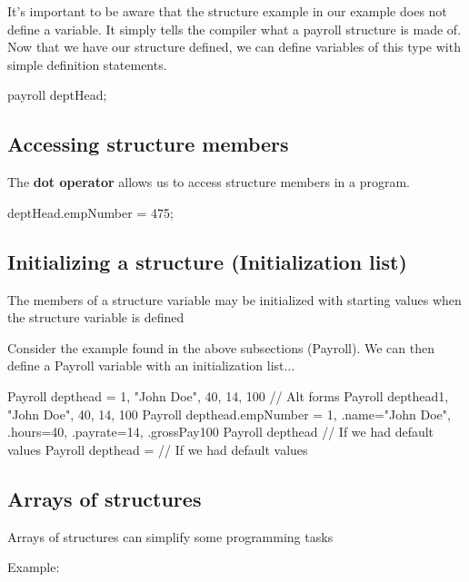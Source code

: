 \documentclass{report}
\begin{document}
	\bigbreak \noindent 

    \bigbreak \noindent 
	It's important to be aware that the structure example in our example does not define a variable. It simply tells the compiler what a payroll structure is made of.
	\bigbreak \noindent 
	Now that we have our structure defined, we can define variables of this type with simple definition statements.
	\bigbreak \noindent 
	
	\begin{cppcode}
payroll deptHead;
	\end{cppcode}
	

	\bigbreak \noindent 
	\subsection{Accessing structure members}
	\bigbreak \noindent 
	\begin{concept}
	    The \textbf{dot operator} allows us to access structure members in a program.
	\end{concept}
	\bigbreak \noindent 
	
	\begin{cppcode}
deptHead.empNumber = 475;
	\end{cppcode}
	

	\bigbreak \noindent 
	\subsection{Initializing a structure (Initialization list)}
	\bigbreak \noindent 
	\begin{concept}
	   The members of a structure variable may be initialized with starting values when the structure variable is defined 
	\end{concept}
	\bigbreak \noindent 
	Consider the example found in the above subsections (Payroll). We can then define a Payroll variable with an initialization list...
	\bigbreak \noindent 
	
	\begin{cppcode}
Payroll depthead = {1, "John Doe", 40, 14, 100}
// Alt forms
Payroll depthead{1, "John Doe", 40, 14, 100} 
Payroll depthead{.empNumber = 1, .name="John Doe", .hours=40, .payrate=14, .grossPay100}
Payroll depthead{} // If we had default values
Payroll depthead = {} // If we had default values
	\end{cppcode}
	

	\pagebreak
	\subsection{Arrays of structures}
	\bigbreak \noindent 
	\begin{concept}
	   Arrays of structures can simplify some programming tasks 
	\end{concept}
	\bigbreak \noindent 
	Example:
	\bigbreak \noindent 
	
\end{document}
